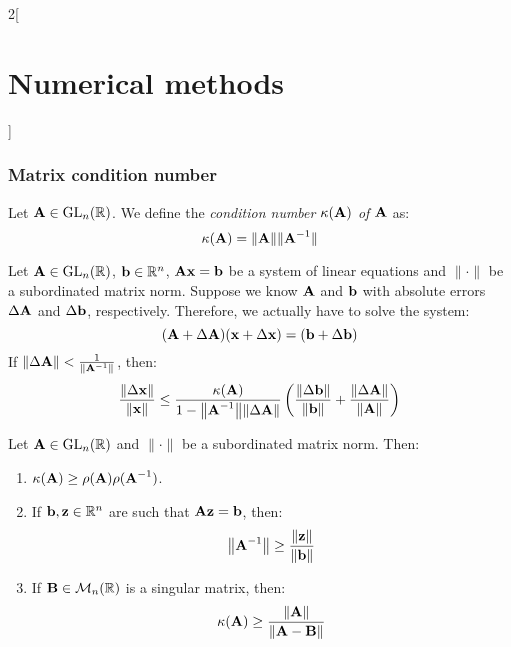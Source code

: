 \documentclass[../../../main.tex]{subfiles}
\begin{document}
\begin{multicols}{2}[\section{Numerical methods}]
    \subsubsection*{Matrix condition number}
    \begin{definition}
        Let $\boldsymbol{\mathrm{A}}\in\mathrm{GL}_n(\mathbb{R})$. We define the \textit{condition number $\kappa(\boldsymbol{\mathrm{A}})$ of $\boldsymbol{\mathrm{A}}$} as: $$\kappa(\boldsymbol{\mathrm{A}})=\|\boldsymbol{\mathrm{A}}\|\|\boldsymbol{\mathrm{A}}^{-1}\|$$
    \end{definition}
    \begin{theorem}
        Let $\boldsymbol{\mathrm{A}}\in\mathrm{GL}_n(\mathbb{R})$, $\boldsymbol{\mathrm{b}}\in\mathbb{R}^n$, $\boldsymbol{\mathrm{A}}\boldsymbol{\mathrm{x}}=\boldsymbol{\mathrm{b}}$ be a system of linear equations and $\|\cdot\|$ be a subordinated matrix norm. Suppose we know $\boldsymbol{\mathrm{A}}$ and $\boldsymbol{\mathrm{b}}$ with absolute errors $\Delta\boldsymbol{\mathrm{A}}$ and $\Delta\boldsymbol{\mathrm{b}}$, respectively. Therefore, we actually have to solve the system: $$(\boldsymbol{\mathrm{A}}+\Delta\boldsymbol{\mathrm{A}})(\boldsymbol{\mathrm{x}}+\Delta \boldsymbol{\mathrm{x}})=(\boldsymbol{\mathrm{b}}+\Delta\boldsymbol{\mathrm{b}})$$ If $\|\Delta\boldsymbol{\mathrm{A}}\|<\frac{1}{\|\boldsymbol{\mathrm{A}}^{-1}\|}$, then: $$\frac{\|\Delta \boldsymbol{\mathrm{x}}\|}{\|\boldsymbol{\mathrm{x}}\|}\leq\frac{\kappa(\boldsymbol{\mathrm{A}})}{1-\norm{\boldsymbol{\mathrm{A}}^{-1}}\norm{\Delta\boldsymbol{\mathrm{A}}}}\left(\frac{\norm{\Delta\boldsymbol{\mathrm{b}}}}{\norm{\boldsymbol{\mathrm{b}}}}+\frac{\norm{\Delta\boldsymbol{\mathrm{A}}}}{\norm{\boldsymbol{\mathrm{A}}}}\right)$$
    \end{theorem}
    \begin{theorem}
        Let $\boldsymbol{\mathrm{A}}\in\mathrm{GL}_n(\mathbb{R})$ and $\|\cdot\|$ be a subordinated matrix norm. Then:
        \begin{enumerate}
            \item $\kappa(\boldsymbol{\mathrm{A}})\geq\rho(\boldsymbol{\mathrm{A}})\rho(\boldsymbol{\mathrm{A}}^{-1})$.
            \item If $\boldsymbol{\mathrm{b}},\boldsymbol{\mathrm{z}}\in\mathbb{R}^n$ are such that $\boldsymbol{\mathrm{A}}\boldsymbol{\mathrm{z}}=\boldsymbol{\mathrm{b}}$, then: $$\norm{\boldsymbol{\mathrm{A}}^{-1}}\geq\frac{\norm{\boldsymbol{\mathrm{z}}}}{\norm{\boldsymbol{\mathrm{b}}}}$$
            \item If $\boldsymbol{\mathrm{B}}\in\mathcal{M}_n(\mathbb{R})$ is a singular matrix, then: $$\kappa(\boldsymbol{\mathrm{A}})\geq\frac{\norm{\boldsymbol{\mathrm{A}}}}{\norm{\boldsymbol{\mathrm{A}}-\boldsymbol{\mathrm{B}}}}$$
        \end{enumerate}
    \end{theorem}

\end{multicols}
\end{document}
